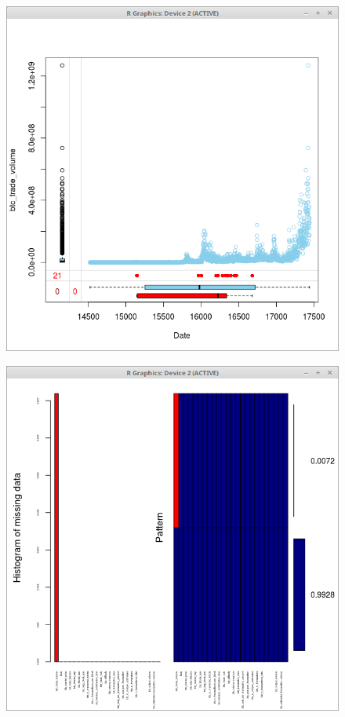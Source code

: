 \documentclass{article}
\begin{document}
\begin{figure}
\centering
\begin{minipage}{.5\textwidth}
  \centering
  \includegraphics[width=.8\linewidth]{btc_dataset_missing}
  \label{fig:test1}
\end{minipage}%
\begin{minipage}{.5\textwidth}
  \centering
  \includegraphics[width=.8\linewidth]{btc_dataset_missing_box_plot}
  \label{fig:test2}
\end{minipage}
\end{figure}
\end{document}
